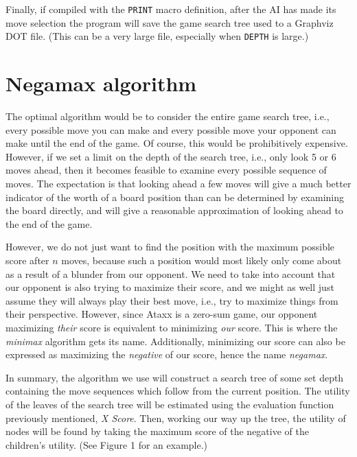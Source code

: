 \documentclass[12pt]{article}
\begin{document}
Finally, if compiled with the \texttt{PRINT} macro definition, after the AI has made its move selection the program will save the game search tree used to a Graphviz DOT file.  (This can be a very large file, especially when \texttt{DEPTH} is large.)

\section{Negamax algorithm}
The optimal algorithm would be to consider the entire game search tree, i.e., every possible move you can make and every possible move your opponent can make until the end of the game.  Of course, this would be prohibitively expensive.  However, if we set a limit on the depth of the search tree, i.e., only look 5 or 6 moves ahead, then it becomes feasible to examine every possible sequence of moves.  The expectation is that looking ahead a few moves will give a much better indicator of the worth of a board position than can be determined by examining the board directly, and will give a reasonable approximation of looking ahead to the end of the game.

However, we do not just want to find the position with the maximum possible score after $n$ moves, because such a position would most likely only come about as a result of a blunder from our opponent.  We need to take into account that our opponent is also trying to maximize their score, and we might as well just assume they will always play their best move, i.e., try to maximize things from their perspective.  However, since Ataxx is a zero-sum game, our opponent maximizing \emph{their} score is equivalent to minimizing \emph{our} score.  This is where the \emph{minimax} algorithm \cite{rusnor,shannon} gets its name.  Additionally, minimizing our score can also be expressed as maximizing the \emph{negative} of our score, hence the name \emph{negamax}.

In summary, the algorithm we use will construct a search tree of some set depth containing the move sequences which follow from the current position.  The utility of the leaves of the search tree will be estimated using the evaluation function previously mentioned, \emph{X Score}.  Then, working our way up the tree, the utility of nodes will be found by taking the maximum score of the negative of the children's utility.  (See Figure 1 for an example.)
\end{document}
